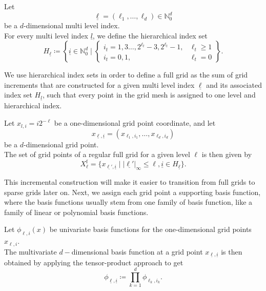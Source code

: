 \documentclass[
  a4paper,  %
  twoside,  %
  bibliography=totoc,
  headsepline,
  cleardoublepage=empty,
  parskip=half,
  draft=false
]{scrbook}
\begin{document}
\begin{definition}
Let
\begin{equation}
\underline{\ell} = (\ell_1, \dots, \ell_d) \in \mathds{N}_0^d
\end{equation}
be a $d$-dimensional multi level index.\\
For every multi level index $\underline{l}$, we define the hierarchical index set
\begin{equation}
H_{\underline{\ell}} \coloneqq \left\{ \underline{i} \in \mathbb{N}^d_0 \mid
\begin{cases}
    i_t=1,3\dots,2^{\ell_t} - 3, 2^{\ell_t} - 1, & \ell_t \geq 1 \\
    i_t=0,1, & \ell_t = 0
\end{cases} \right\}.
\end{equation}
\end{definition}

We use hierarchical index sets in order to define a full grid as the sum of grid increments that are constructed for a given multi level index $\underline{\ell}$ and its associated index set $H_{\underline{l}}$, such that every point in the grid mesh is assigned to one level and hierarchical index.

\begin{definition}
Let $x_{l,i}=i2^{-\ell}$ be a one-dimensional grid point coordinate, and let
\begin{equation}
x_{\underline{\ell},\underline{i}}=(x_{\ell_1,i_1}, \dots, x_{\ell_d,i_d})
\end{equation}
be a $d$-dimensional grid point.\\
The set of grid points of a regular full grid for a given level $\ell$ is then given by
\begin{equation}
X^{\text{f}}_{\ell}=\{x_{\underline{\ell'},\underline{i}} \mid |\underline{\ell'}|_{\infty} \leq \ell, \underline{i} \in H_{\underline{\ell}}\}.
\end{equation}
\end{definition}

This incremental construction will make it easier to transition from full grids to sparse grids later on.
Next, we assign each grid point a supporting basis function, where the basis functions usually stem from one family of basis function, like a family of linear or polynomial basis functions.

\begin{definition}
Let $\phi_{\ell,i}(x)$ be univariate basis functions for the one-dimensional grid points $x_{\ell,i}$.\\
The multivariate $d-$dimensional basis function at a grid point $x_{\underline{\ell},\underline{i}}$ is then obtained by applying the tensor-product approach to get
\begin{equation}
\phi_{\underline{\ell},\underline{i}} \coloneqq \prod_{k=1}^{d} \phi_{\ell_k,i_k}.
\label{eq:basis_functions}
\end{equation}
\end{definition}
\end{document}
